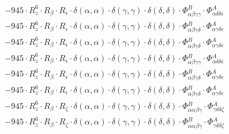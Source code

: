 \documentclass{article}
\begin{document}
\begin{subequations}
\begin{gather}
\begin{array}{c}
 \\[0.2em] 		 - 945 \cdot R_{z}^{6} \cdot R_{\beta{}} \cdot R_{\epsilon{}} \cdot \delta{}\left(\alpha{}, \alpha{}\right) \cdot \delta{}\left(\gamma{}, \gamma{}\right) \cdot \delta{}\left(\delta{}, \delta{}\right) \cdot \Phi{}^{B}_{\alpha{}\beta{}\gamma{}\gamma{}} \cdot \Phi{}^{A}_{\alpha{}\delta{}\delta{}\epsilon{}} 
 \\[0.2em] 		 - 945 \cdot R_{z}^{6} \cdot R_{\beta{}} \cdot R_{\epsilon{}} \cdot \delta{}\left(\alpha{}, \alpha{}\right) \cdot \delta{}\left(\gamma{}, \gamma{}\right) \cdot \delta{}\left(\delta{}, \delta{}\right) \cdot \Phi{}^{B}_{\alpha{}\beta{}\gamma{}\delta{}} \cdot \Phi{}^{A}_{\alpha{}\gamma{}\delta{}\epsilon{}} 
 \\[0.2em] 		 - 945 \cdot R_{z}^{6} \cdot R_{\beta{}} \cdot R_{\epsilon{}} \cdot \delta{}\left(\alpha{}, \alpha{}\right) \cdot \delta{}\left(\gamma{}, \gamma{}\right) \cdot \delta{}\left(\delta{}, \delta{}\right) \cdot \Phi{}^{B}_{\alpha{}\beta{}\gamma{}\delta{}} \cdot \Phi{}^{A}_{\alpha{}\gamma{}\delta{}\epsilon{}} 
 \\[0.2em] 		 - 945 \cdot R_{z}^{6} \cdot R_{\beta{}} \cdot R_{\epsilon{}} \cdot \delta{}\left(\alpha{}, \alpha{}\right) \cdot \delta{}\left(\gamma{}, \gamma{}\right) \cdot \delta{}\left(\delta{}, \delta{}\right) \cdot \Phi{}^{B}_{\alpha{}\beta{}\gamma{}\gamma{}} \cdot \Phi{}^{A}_{\alpha{}\delta{}\delta{}\epsilon{}} 
 \\[0.2em] 		 - 945 \cdot R_{z}^{6} \cdot R_{\beta{}} \cdot R_{\epsilon{}} \cdot \delta{}\left(\alpha{}, \alpha{}\right) \cdot \delta{}\left(\gamma{}, \gamma{}\right) \cdot \delta{}\left(\delta{}, \delta{}\right) \cdot \Phi{}^{B}_{\alpha{}\beta{}\gamma{}\delta{}} \cdot \Phi{}^{A}_{\alpha{}\gamma{}\delta{}\epsilon{}} 
 \\[0.2em] 		 - 945 \cdot R_{z}^{6} \cdot R_{\beta{}} \cdot R_{\epsilon{}} \cdot \delta{}\left(\alpha{}, \alpha{}\right) \cdot \delta{}\left(\gamma{}, \gamma{}\right) \cdot \delta{}\left(\delta{}, \delta{}\right) \cdot \Phi{}^{B}_{\alpha{}\beta{}\gamma{}\delta{}} \cdot \Phi{}^{A}_{\alpha{}\gamma{}\delta{}\epsilon{}} 
 \\[0.2em] 		 - 945 \cdot R_{z}^{6} \cdot R_{\beta{}} \cdot R_{\zeta{}} \cdot \delta{}\left(\alpha{}, \alpha{}\right) \cdot \delta{}\left(\gamma{}, \gamma{}\right) \cdot \delta{}\left(\delta{}, \delta{}\right) \cdot \Phi{}^{B}_{\alpha{}\alpha{}\beta{}\gamma{}} \cdot \Phi{}^{A}_{\gamma{}\delta{}\delta{}\zeta{}} 
 \\[0.2em] 		 - 945 \cdot R_{z}^{6} \cdot R_{\beta{}} \cdot R_{\zeta{}} \cdot \delta{}\left(\alpha{}, \alpha{}\right) \cdot \delta{}\left(\gamma{}, \gamma{}\right) \cdot \delta{}\left(\delta{}, \delta{}\right) \cdot \Phi{}^{B}_{\alpha{}\alpha{}\beta{}\gamma{}} \cdot \Phi{}^{A}_{\gamma{}\delta{}\delta{}\zeta{}} 

\end{array}
\end{gather}
\end{subequations}
\end{document}
